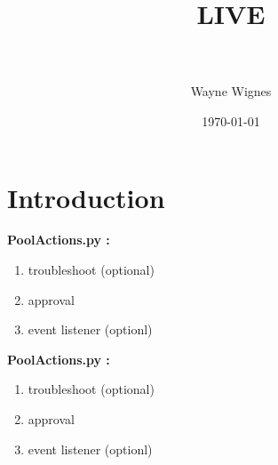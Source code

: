\documentclass{article}
\title{\textbf{LIVE}}
\author{\\ \\ Wayne Wignes}
\date{ \today}
\begin{document}
\part*{Introduction}

\textbf{PoolActions.py :}
\begin{enumerate} 
\item troubleshoot (optional)
 \item approval
\item event listener (optionl)
\end{enumerate} 

\textbf{PoolActions.py :}
\begin{enumerate} 
\item troubleshoot (optional)
 \item approval
\item event listener (optionl)
\end{enumerate} 








  
  
  
  
\end{document}
